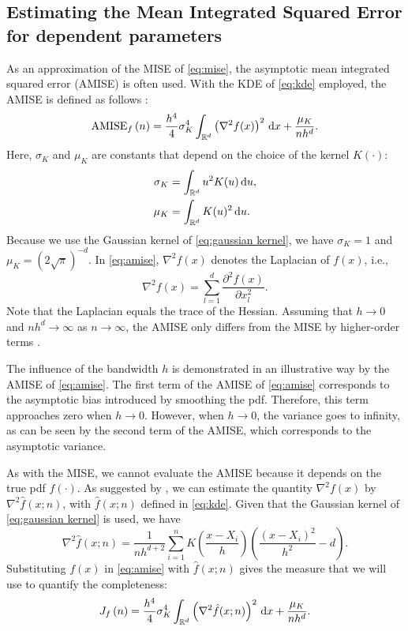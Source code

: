 \subsection{Estimating the Mean Integrated Squared Error for dependent parameters}
\label{sec:mise dependent}

As an approximation of the MISE of \cref{eq:mise}, the asymptotic mean integrated squared error (AMISE) is often used. With the KDE of \cref{eq:kde} employed, the AMISE is defined as follows \cite{marron1992exact}:
\begin{equation}
	\label{eq:amise}
	\textup{AMISE}_{f} \left( n \right) = \frac{h^4}{4} \sigma_K^4 \int_{\mathbb{R}^d} \left( \nabla^2 f(x) \right)^2 \mathrm{\,d} x + \frac{\mu_K}{nh^d}.
\end{equation}
Here, $\sigma_K$ and $\mu_K$ are constants that depend on the choice of the kernel $K(\cdot)$:
\begin{align}
	\sigma_K &= \int_{\mathbb{R}^d} u^2 K(u) \mathrm{\,d} u, \\
	\mu_K &= \int_{\mathbb{R}^d} K(u)^2 \mathrm{\,d} u.
\end{align}
Because we use the Gaussian kernel of \cref{eq:gaussian kernel}, we have $\sigma_K=1$ and $\mu_K=(2\sqrt{\pi})^{-d}$. In \cref{eq:amise}, $\nabla^2 f(x)$ denotes the Laplacian of $f(x)$, i.e., 
\begin{equation}
	\nabla^2 f(x) = \sum_{l=1}^d \frac{\partial^2 f(x)}{\partial x_l^2}.
\end{equation}
Note that the Laplacian equals the trace of the Hessian. Assuming that $h \rightarrow 0$ and $nh^d \rightarrow \infty$ as $n \rightarrow \infty$, the AMISE only differs from the MISE by higher-order terms \cite{silverman1986density}.

The influence of the bandwidth $h$ is demonstrated in an illustrative way by the AMISE of \cref{eq:amise}. The first term of the AMISE of \cref{eq:amise} corresponds to the asymptotic bias introduced by smoothing the pdf. Therefore, this term approaches zero when $h \rightarrow 0$. However, when $h \rightarrow 0$, the variance goes to infinity, as can be seen by the second term of the AMISE, which corresponds to the asymptotic variance. 

As with the MISE, we cannot evaluate the AMISE because it depends on the true pdf $f(\cdot)$. As suggested by \textcite{chen2017tutorial, calonico2018effect}, we can estimate the quantity $\nabla^2 f(x)$ by $\nabla^2 \hat{f}(x;n)$, with $\hat{f}(x;n)$ defined in \cref{eq:kde}. Given that the Gaussian kernel of \cref{eq:gaussian kernel} is used, we have
\begin{equation}
	\label{eq:laplacian gaussian}
	\nabla^2 \hat{f}(x;n) = \frac{1}{nh^{d+2}} \sum_{i=1}^n K\left( \frac{x - X_i}{h} \right) \left( \frac{\left(x-X_i\right)^2}{h^2} - d \right).
\end{equation}
Substituting $f(x)$ in \cref{eq:amise} with $\hat{f}(x;n)$ gives the measure that we will use to quantify the completeness:
\begin{equation}
	\label{eq:measure}
	J_{f} \left( n \right) = \frac{h^4}{4} \sigma_K^4 \int_{\mathbb{R}^d} \left( \nabla^2 \hat{f}(x;n) \right)^2 \mathrm{\,d} x + \frac{\mu_K}{nh^d}.
\end{equation}

